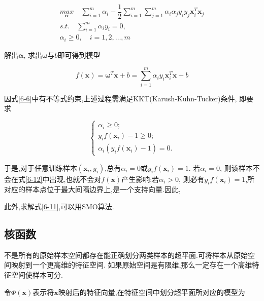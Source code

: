 \documentclass[12pt]{article}
\numberwithin{equation}{section}%
\begin{document}
\begin{equation}
\begin{split} 
{\underset{\boldsymbol{\alpha}}{max}} \quad  \sum_{i=1}^{m}\alpha_{i}-\dfrac{1}{2}\sum_{i=1}^{m}\sum_{j=1}^{m}\alpha_{i}\alpha_{j}y_{i}y_{j}{\boldsymbol{x}}_{i}^{T}{\boldsymbol{x}}_{j}  \\
s.t. \quad \sum_{i=1}^{m}\alpha_{i}y_{i} = 0,  \\
\alpha_{i} \geqslant 0, \quad i=1,2, \ldots, m 
\end{split}
\label{6-11}
\end{equation}

解出$\boldsymbol{\alpha}$, 求出$\boldsymbol{\omega}$与$b$即可得到模型

\begin{equation}
f(\boldsymbol{x})=\boldsymbol{\omega}^{T}\boldsymbol{x}+b=\sum_{i=1}^{m}\alpha_{i}y_{i}{\boldsymbol{x}}_{i}^{T}{\boldsymbol{x}}+b
\label{6-12}
\end{equation}

因式\ref{6-6}中有不等式约束,上述过程需满足KKT(Karush-Kuhn-Tucker)条件, 即要求

\begin{equation}
 \left\{ \begin{array}{ll}
\alpha_{i} \geqslant 0;\\
 y_{i}f(\boldsymbol{x}_{i})-1\geqslant 0; \\
 \alpha_{i}(y_{i}f(\boldsymbol{x}_{i})-1) = 0.
\end{array} \right.
\end{equation}

于是,对于任意训练样本$(\boldsymbol{x}_{i},y_{i})$,总有$\alpha_{i}=0$或$y_{i}f(\boldsymbol{x}_{i}) =1$. 若$\alpha_{i}=0$, 则该样本不会在式\ref{6-12}中出现,也就不会对$f(\boldsymbol{x})$产生影响;若$\alpha_{i} > 0$, 则必有$y_{i}f(\boldsymbol{x}_{i})=1$,所对应的样本点位于最大间隔边界上,是一个支持向量.因此,{\color{red}{训练完成后,大部分的训练样本都不需要保留,最终模型仅与支持向量有关.}}

此外,{\color{blue}求解式\ref{6-11},可以用SMO算法.}

\subsection{核函数}

不是所有的原始样本空间都存在能正确划分两类样本的超平面.可将样本从原始空间映射到一个更高维的特征空间. 如果原始空间是有限维,那么一定存在一个高维特征空间使样本可分.

令$\Phi(\boldsymbol{x})$表示将$\boldsymbol{x}$映射后的特征向量,在特征空间中划分超平面所对应的模型为
\end{document}
